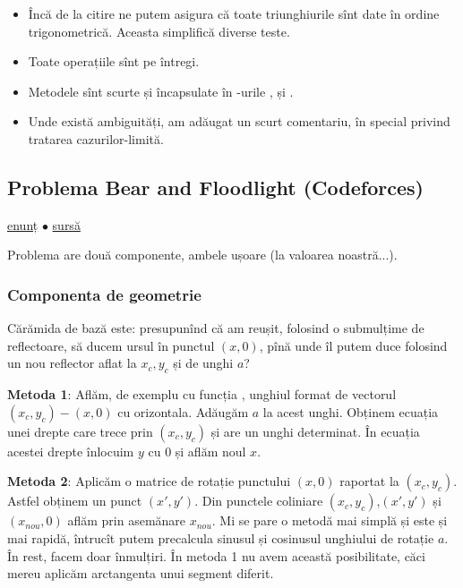 \documentclass[../main.tex]{subfiles}
\begin{document}
\begin{itemize}
  \item Încă de la citire ne putem asigura că toate triunghiurile sînt date în ordine trigonometrică. Aceasta simplifică diverse teste.

  \item Toate operațiile sînt pe întregi.

  \item Metodele sînt scurte și încapsulate în -urile ,  și .

  \item Unde există ambiguități, am adăugat un scurt comentariu, în special privind tratarea cazurilor-limită.
\end{itemize}

\subsection{Problema Bear and Floodlight (Codeforces)}
\label{problem:bear-and-floodlight}

\href{https://codeforces.com/contest/385/problem/D}{enunț}
$\bullet$
\hyperref[code:bear-and-floodlight]{sursă}

Problema are două componente, ambele ușoare (la valoarea noastră...).

\subsubsection*{Componenta de geometrie}

Cărămida de bază este: presupunînd că am reușit, folosind o submulțime de reflectoare, să ducem ursul în punctul $(x,0)$, pînă unde îl putem duce folosind un nou reflector aflat la $x_c, y_c$ și de unghi $a$?

\textbf{Metoda 1}: Aflăm, de exemplu cu funcția , unghiul format de vectorul $(x_c, y_c)-(x, 0)$ cu orizontala. Adăugăm $a$ la acest unghi. Obținem ecuația unei drepte care trece prin $(x_c,y_c)$ și are un unghi determinat. În ecuația acestei drepte înlocuim $y$ cu 0 și aflăm noul $x$.

\textbf{Metoda 2}: Aplicăm o matrice de rotație punctului $(x,0)$ raportat la $(x_c, y_c)$. Astfel obținem un punct $(x', y')$. Din punctele coliniare $(x_c,y_c)$,$ (x', y')$ și $(x_{nou}, 0)$ aflăm prin asemănare $x_{nou}$. Mi se pare o metodă mai simplă și este și mai rapidă, întrucît putem precalcula sinusul și cosinusul unghiului de rotație $a$. În rest, facem doar înmulțiri. În metoda 1 nu avem această posibilitate, căci mereu aplicăm arctangenta unui segment diferit.
\end{document}
